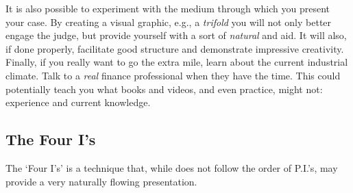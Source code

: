 \documentclass[12pt]{article}
\begin{document}
It is also possible to experiment with the medium through which you present your case. By creating a visual graphic, e.g., a \textit{trifold} you will not only better engage the judge, but provide yourself with a sort of \textit{natural} and aid. It will also, if done properly, facilitate good structure and demonstrate impressive creativity. \\

Finally, if you really want to go the extra mile, learn about the current industrial climate. Talk to a \textit{real} finance professional when they have the time. This could potentially teach you what books and videos, and even practice, might not: experience and current knowledge.

\subsection{The Four I's}

The \lq Four I's' is a technique that, while does not follow the order of P.I.'s, may provide a very naturally flowing presentation. 
\end{document}
